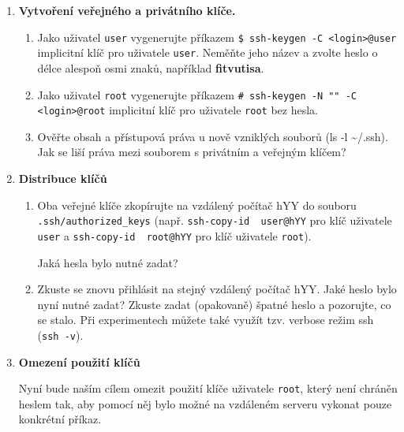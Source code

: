 \documentclass[a4paper,11pt]{article}
\begin{document}
\begin{enumerate}
  \item {\bf Vytvoření veřejného a privátního klíče.}

    \begin{enumerate}

      \item Jako uživatel {\tt user} vygenerujte příkazem \verb|$ ssh-keygen -C <login>@user|
        implicitní klíč pro uživatele
        {\tt user}. Neměňte jeho
        název a zvolte heslo o délce alespoň osmi znaků, například
        \textbf{fitvutisa}.

      \item Jako uživatel {\tt root} vygenerujte příkazem \verb|# ssh-keygen -N "" -C <login>@root|
        implicitní klíč pro uživatele {\tt root} bez hesla.

      \item Ověřte obsah a přístupová práva u nově vzniklých souborů (ls -l \textasciitilde/.ssh). Jak
se liší práva mezi souborem s privátním a veřejným klíčem?

    \end{enumerate}

  \item {\bf Distribuce klíčů}

    \begin{enumerate}

      \item Oba veřejné klíče zkopírujte na vzdálený počítač hYY do
        souboru \verb|.ssh/authorized_keys|
        (např. {\verb&ssh-copy-id  user@hYY&} pro
        klíč uživatele {\tt user}
        a {\verb&ssh-copy-id  root@hYY&} pro
        klíč uživatele {\tt root}).
        
      Jaká hesla bylo nutné zadat?

      \item Zkuste se znovu přihlásit na stejný vzdálený počítač hYY. Jaké heslo bylo nyní nutné zadat? Zkuste
        zadat (opakovaně) špatné heslo a pozorujte, co se stalo. Při experimentech můžete také
využít tzv. verbose režim ssh ({\tt ssh -v}).

    \end{enumerate}

  \item {\bf Omezení použití klíčů}

    Nyní bude naším cílem omezit použití klíče uživatele {\tt root}, který není chráněn heslem tak,
    aby pomocí něj bylo možné na vzdáleném serveru vykonat pouze konkrétní příkaz.

    \begin{enumerate}


\end{enumerate}
\end{enumerate}
\end{document}
